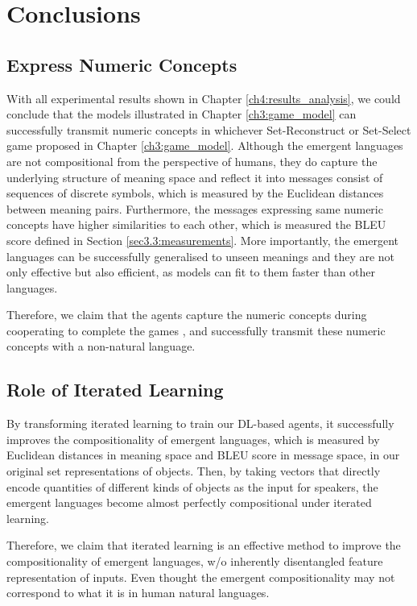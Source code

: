 \chapter{Conclusions}
\label{ch5:conclusion}

\section{Express Numeric Concepts}
\label{sec5.1:numeric_represent}

With all experimental results shown in Chapter \ref{ch4:results_analysis}, we could conclude that the models illustrated in Chapter \ref{ch3:game_model} can successfully transmit numeric concepts in whichever Set-Reconstruct or Set-Select game proposed in Chapter \ref{ch3:game_model}. Although the emergent languages are not compositional from the perspective of humans, they do capture the underlying structure of meaning space and reflect it into messages consist of sequences of discrete symbols, which is measured by the Euclidean distances between meaning pairs. Furthermore, the messages expressing same numeric concepts have higher similarities to each other, which is measured the BLEU score defined in Section \ref{sec3.3:measurements}. More importantly, the emergent languages can be successfully generalised to unseen meanings and they are not only effective but also efficient, as models can fit to them faster than other languages.

Therefore, we claim that the agents capture the numeric concepts during cooperating to complete the games , and successfully transmit these numeric concepts with a non-natural language.

\section{Role of Iterated Learning}
\label{sec5.2:iterated_learning}

By transforming iterated learning to train our DL-based agents, it successfully improves the compositionality of emergent languages, which is measured by Euclidean distances in meaning space and BLEU score in message space, in our original set representations of objects. Then, by taking vectors that directly encode quantities of different kinds of objects as the input for speakers, the emergent languages become almost perfectly compositional under iterated learning.

Therefore, we claim that iterated learning is an effective method to improve the compositionality of emergent languages, w/o inherently disentangled feature representation of inputs. Even thought the emergent compositionality may not correspond to what it is in human natural languages.

